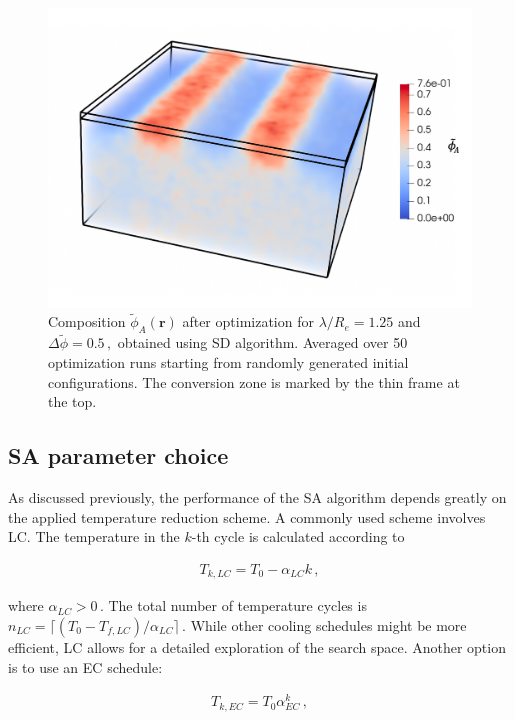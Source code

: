 \documentclass[bachelor,       %
               oneside,        %
               BCOR10mm,       %
               ngerman, english %
               ]{GAUBM}
\begin{document}
\begin{figure}[h]
    \centering
    \includegraphics[width=0.5
    \linewidth]{figures/conversion_box}
    \caption{Composition $\tilde\phi_A(\mathbf r)$ after optimization for $\lambda/R_e=1.25$ and $\Delta\tilde\phi=0.5\,,$ obtained using \ac{SD} algorithm. Averaged over 50 optimization runs starting from randomly generated initial configurations. The conversion zone is marked by the thin frame at the top.}
    \label{fig:conversion_box}
\end{figure}

\subsection{SA parameter choice}

As discussed previously, the performance of the \ac{SA} algorithm depends greatly on the applied temperature reduction scheme. A commonly used scheme involves \ac{LC}. The temperature in the $k$-th cycle is calculated according to

\begin{align}
    T_{k,LC}=T_0-\alpha_{LC} k\,,
    \label{eq:lin_cool}
\end{align}

where $\alpha_{LC}>0\,.$ The total number of temperature cycles is $n_{LC}=\lceil(T_0-T_{f,LC})/\alpha_{LC}\rceil\,.$ While other cooling schedules might be more efficient, \ac{LC} allows for a detailed exploration of the search space. Another option is to use an \ac{EC} schedule:

\begin{align}
    T_{k,EC}=T_0\alpha_{EC}^k\,,
    \label{eq:exp_cool}
\end{align}
\end{document}

